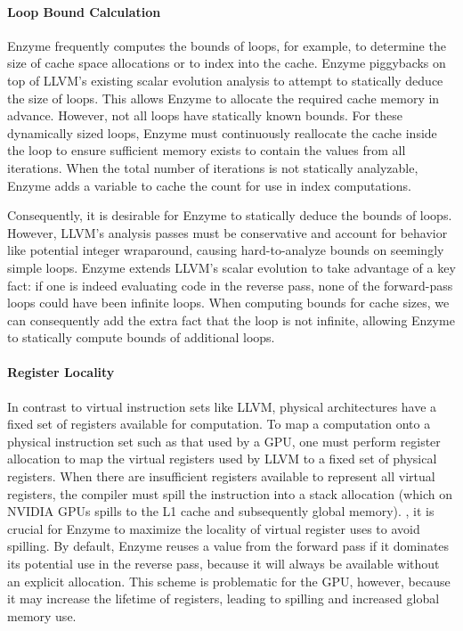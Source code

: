 \paragraph{\textbf{Loop Bound Calculation}}
Enzyme frequently computes the bounds of loops, for example, to determine the size of cache space allocations or to index into the cache. Enzyme piggybacks on top of LLVM's existing scalar evolution analysis to attempt to statically deduce the size of loops. This allows Enzyme to allocate the required cache memory in advance. However, not all loops have statically known bounds. For these dynamically sized loops, Enzyme must continuously reallocate the cache inside the loop to ensure sufficient memory exists to contain the values from all iterations. When the total number of iterations is not statically analyzable, Enzyme  adds a variable to cache the count for use in index computations.

Consequently, it is desirable for Enzyme to statically deduce the bounds of loops. However, LLVM's analysis passes must be conservative and account for behavior like potential integer wraparound, causing hard-to-analyze bounds on seemingly simple loops.
Enzyme extends LLVM's scalar evolution to take advantage of a key fact: if one is indeed evaluating code in the reverse pass, none of the forward-pass loops could have been infinite loops. When computing bounds for cache sizes, we can consequently add the extra fact that the loop is not infinite, allowing Enzyme to statically compute bounds of additional loops.

\paragraph{\textbf{Register Locality}}
In contrast to virtual instruction sets like LLVM, physical architectures have a fixed set of registers available for computation. To map a computation onto a physical instruction set such as that used by a GPU, one must perform register allocation to map the virtual registers used by LLVM to a fixed set of physical registers. When there are insufficient registers available to represent all virtual registers, the compiler must spill the instruction into a stack allocation (which on NVIDIA GPUs spills to the L1 cache and subsequently global memory). , it is crucial for Enzyme to maximize the locality of virtual register uses to avoid spilling. By default, Enzyme reuses a value from the forward pass if it dominates its potential use in the reverse pass, because it will always be available without an explicit allocation.
This scheme is problematic for the GPU, however, because it may increase the lifetime of registers, leading to spilling and increased global memory use.

